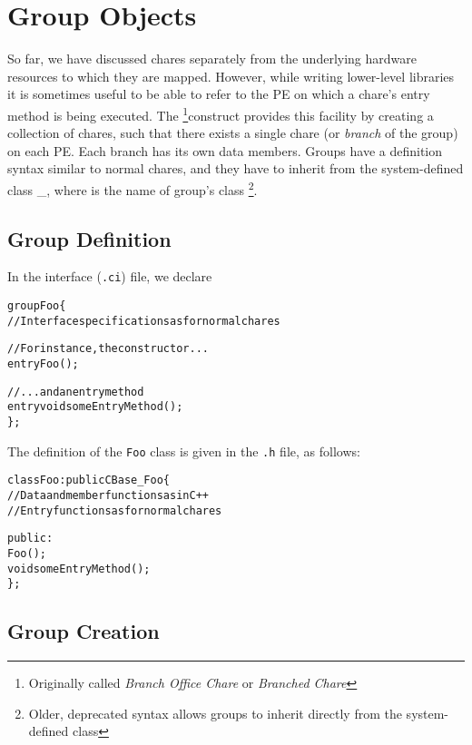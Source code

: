 \section{Group Objects}
\label{sec:group}

So far, we have discussed chares separately from the underlying hardware resources 
to which they are mapped. However, while writing lower-level libraries it is sometimes
useful to be able to refer to the PE on which a chare's entry method is being executed.
The  \footnote{Originally called {\em Branch Office Chare} or 
{\em Branched Chare}}construct provides this facility by creating a 
collection of chares, such that 
there exists a single chare (or {\sl branch} of the group) on each
PE.   Each branch has its own data members.  Groups have
a definition syntax similar to normal chares,
and they have to inherit from the system-defined class \_, 
where  is the name of group's \CC{} class
\footnote{Older, deprecated syntax allows groups to inherit directly from the
system-defined class }.

\subsection{Group Definition}

In the interface ({\tt .ci}) file, we declare

\begin{alltt}
group Foo \{
  // Interface specifications as for normal chares

  // For instance, the constructor ...
  entry Foo();

  // ... and an entry method
  entry void someEntryMethod();
\};
\end{alltt}

The definition of the {\tt Foo} class is given in the \texttt{.h} file, as follows:

\begin{alltt}
class Foo : public CBase\_Foo \{
  // Data and member functions as in C++
  // Entry functions as for normal chares

  public:
    Foo();
    void someEntryMethod();
\};
\end{alltt}

\subsection{Group Creation}

